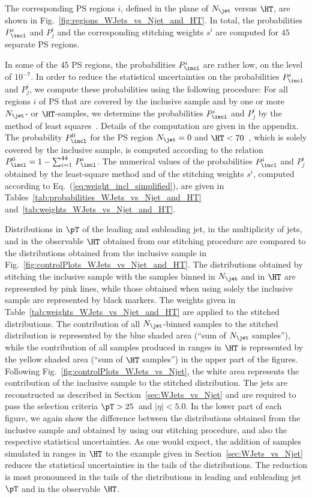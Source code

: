 The corresponding PS regions $i$, defined in the plane of $N_{\jet}$ versus $\HT$, are shown in Fig.~\ref{fig:regions_WJets_vs_Njet_and_HT}.
In total, the probabilities $P_{\incl}^{i}$ and $P_{j}^{i}$ and the corresponding stitching weights $s^{i}$ are computed for $45$ separate PS regions.

In some of the $45$ PS regions, the probabilities $P_{\incl}^{i}$ are rather low, on the level of $10^{-7}$.
In order to reduce the statistical uncertainties on the probabilities $P_{\incl}^{i}$ and $P_{j}^{i}$,
we compute these probabilities using the following procedure:
For all regions $i$ of PS that are covered by the inclusive sample and by one or more $N_{\jet}$- or $\HT$-samples,
we determine the probabilities $P_{\incl}^{i}$ and $P_{j}^{i}$ by the method of least squares~\cite{Cowan:1998ji}.
Details of the computation are given in the appendix.
The probability $P_{\incl}^{0}$ for the PS region $N_{\jet} = 0$ and $\HT < 70$~\GeV,
which is solely covered by the inclusive sample,
is computed according to the relation $P_{\incl}^{0} = 1 - \sum_{i=1}^{44} \, P_{\incl}^{i}$.
The numerical values of the probabilities $P_{\incl}^{i}$ and $P_{j}^{i}$ obtained by the least-square method
and of the stitching weights $s^{i}$, computed according to Eq.~(\ref{eq:weight_incl_simplified}), are given in Tables~\ref{tab:probabilities_WJets_vs_Njet_and_HT}
and~\ref{tab:weights_WJets_vs_Njet_and_HT}.

Distributions in $\pT$ of the leading and subleading jet,
in the multiplicity of jets, and in the observable $\HT$ 
obtained from our stitching procedure are compared to the distributions obtained from the inclusive sample in Fig.~\ref{fig:controlPlots_WJets_vs_Njet_and_HT}.
The distributions obtained by stitching the inclusive sample with the samples binned in $N_{\jet}$ and in $\HT$ are represented by pink lines,
while those obtained when using solely the inclusive sample are represented by black markers.
The weights given in Table~\ref{tab:weights_WJets_vs_Njet_and_HT} are applied to the stitched distributions.
The contribution of all $N_{\jet}$-binned samples to the stitched distribution is represented by the blue shaded area (``sum of $N_{\jet}$ samples''),
while the contribution of all samples produced in ranges in $\HT$ is represented by the yellow shaded area (``sum of $\HT$ samples'') in the upper part of the figures.
Following Fig.~\ref{fig:controlPlots_WJets_vs_Njet},
the white area represents the contribution of the inclusive sample to the stitched distribution.
The jets are reconstructed as described in Section~\ref{sec:WJets_vs_Njet} and are required to pass the selection criteria $\pT > 25$~\GeV and $\vert\eta\vert < 5.0$.
In the lower part of each figure, we again show the difference between the distributions obtained from the inclusive sample and obtained by using our stitching procedure,
and also the respective statistical uncertainties.
As one would expect, the addition of samples simulated in ranges in $\HT$ to the example given in Section~\ref{sec:WJets_vs_Njet}
reduces the statistical uncertainties in the tails of the distributions.
The reduction is most pronounced in the tails of the distributions in leading and subleading jet $\pT$ and in the observable $\HT$.

